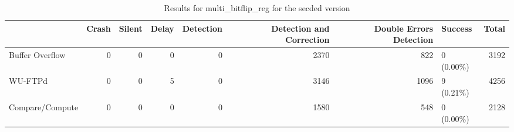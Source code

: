 \begin{table}[t]
	\centering
	\caption{Results for multi_bitflip_reg for the secded version}
	\label{table:end_sim_by_status_secded_4_multi_bitflip_reg}
	\begin{tabular}{lrrrrrrlr}
		\toprule
		                & Crash & Silent & Delay & Detection & Detection and Correction & Double Errors Detection & Success    & Total \\
		\midrule
		Buffer Overflow & 0     & 0      & 0     & 0         & 2370                     & 822                     & 0 (0.00\%) & 3192  \\
		WU-FTPd         & 0     & 0      & 5     & 0         & 3146                     & 1096                    & 9 (0.21\%) & 4256  \\
		Compare/Compute & 0     & 0      & 0     & 0         & 1580                     & 548                     & 0 (0.00\%) & 2128  \\
		\bottomrule
	\end{tabular}
\end{table}
